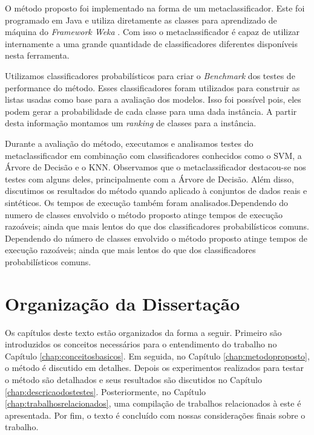 O método proposto foi implementado na forma de um metaclassificador.
Este foi programado em Java e utiliza diretamente as classes para aprendizado de máquina do \textit{Framework Weka} \cite{Hall}.
Com isso o metaclassificador é capaz de utilizar internamente a uma grande quantidade de classificadores diferentes disponíveis nesta ferramenta.

Utilizamos classificadores probabilísticos para criar o \textit{Benchmark} dos testes de performance do método. 
Esses classificadores foram utilizados para construir as listas usadas como base para a avaliação dos modelos.
Isso foi possível pois, eles podem gerar a probabilidade de cada classe para uma dada instância.
A partir desta informação montamos um \textit{ranking} de classes para a instância.

Durante a avaliação do método, executamos e analisamos testes do metaclassificador em combinação com classificadores conhecidos como o SVM, a Árvore de Decisão e o KNN.
Observamos que o metaclassificador destacou-se nos testes com alguns deles, principalmente com a Árvore de Decisão.
Além disso, discutimos os resultados do método quando aplicado à conjuntos de dados reais e sintéticos.
Os tempos de execução também foram analisados.Dependendo do numero de classes envolvido o método proposto atinge tempos de execução razoáveis; ainda que mais lentos do que dos classificadores probabilísticos comuns.
Dependendo do número de classes envolvido o método proposto atinge tempos de execução razoáveis; ainda que mais lentos do que dos classificadores probabilísticos comuns.

\section{Organização da Dissertação}

Os capítulos deste texto estão organizados da forma a seguir.
Primeiro são introduzidos os conceitos necessários para o entendimento do trabalho no Capítulo \ref{chap:conceitosbasicos}.
Em seguida, no Capítulo \ref{chap:metodoproposto}, o método é discutido em detalhes.
Depois os experimentos realizados para testar o método são detalhados e seus resultados são discutidos no Capítulo \ref{chap:descricaodostestes}.
Posteriormente, no Capítulo \ref{chap:trabalhosrelacionados}, uma compilação de trabalhos relacionados à este é apresentada.
Por fim, o texto é concluído com nossas considerações finais sobre o trabalho.
